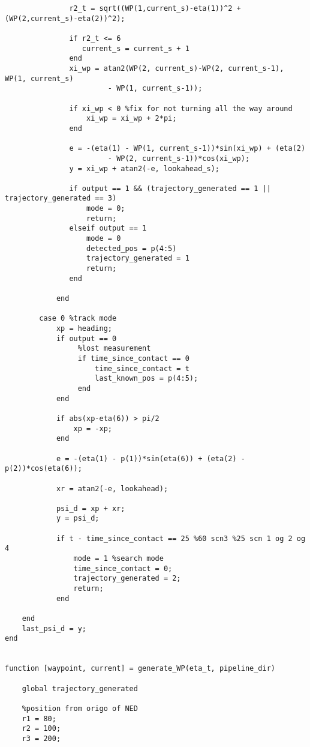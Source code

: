 \begin{lstlisting}
               r2_t = sqrt((WP(1,current_s)-eta(1))^2 + (WP(2,current_s)-eta(2))^2);
               
               if r2_t <= 6
                  current_s = current_s + 1
               end
               xi_wp = atan2(WP(2, current_s)-WP(2, current_s-1), WP(1, current_s)
 				 		- WP(1, current_s-1));
               
               if xi_wp < 0 %fix for not turning all the way around
                   xi_wp = xi_wp + 2*pi;
               end
               
               e = -(eta(1) - WP(1, current_s-1))*sin(xi_wp) + (eta(2) 
						- WP(2, current_s-1))*cos(xi_wp);
               y = xi_wp + atan2(-e, lookahead_s); 
               
               if output == 1 && (trajectory_generated == 1 || trajectory_generated == 3)
                   mode = 0;
                   return;
               elseif output == 1
                   mode = 0
                   detected_pos = p(4:5)
                   trajectory_generated = 1
                   return;
               end
               
            end

        case 0 %track mode
            xp = heading;
            if output == 0
                 %lost measurement
                 if time_since_contact == 0
                     time_since_contact = t
                     last_known_pos = p(4:5);
                 end
            end
            
            if abs(xp-eta(6)) > pi/2
                xp = -xp;
            end

            e = -(eta(1) - p(1))*sin(eta(6)) + (eta(2) - p(2))*cos(eta(6));

            xr = atan2(-e, lookahead);

            psi_d = xp + xr;
            y = psi_d;
            
            if t - time_since_contact == 25 %60 scn3 %25 scn 1 og 2 og 4
                mode = 1 %search mode
                time_since_contact = 0;
                trajectory_generated = 2;
                return;
            end 

    end
    last_psi_d = y;
end


function [waypoint, current] = generate_WP(eta_t, pipeline_dir)
    
    global trajectory_generated
    
    %position from origo of NED
    r1 = 80;
    r2 = 100;
    r3 = 200;
     

\end{lstlisting}
